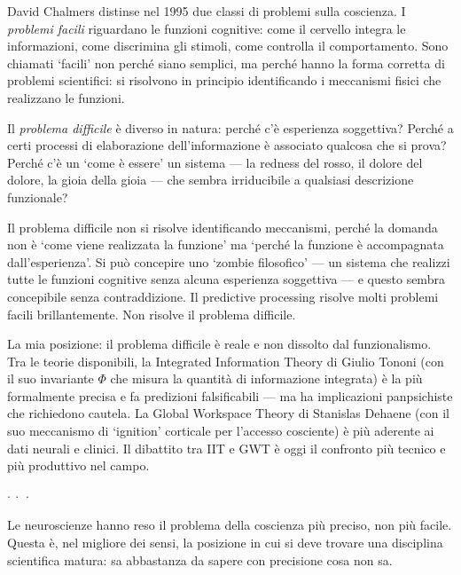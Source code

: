 \documentclass[12pt,a4paper,openany]{book}
\newcommand{\sezione}[1]{\vspace{1.2em}{\large\bfseries #1}\vspace{0.5em}\par}
\newcommand{\puntini}{\begin{center}$\cdot\ \cdot\ \cdot$\end{center}\vspace{0.3em}}
\begin{document}
\sezione{Il problema difficile della coscienza}

David Chalmers distinse nel 1995 due classi di problemi sulla coscienza. I \textit{problemi facili} riguardano le funzioni cognitive: come il cervello integra le informazioni, come discrimina gli stimoli, come controlla il comportamento. Sono chiamati `facili' non perché siano semplici, ma perché hanno la forma corretta di problemi scientifici: si risolvono in principio identificando i meccanismi fisici che realizzano le funzioni.

Il \textit{problema difficile} è diverso in natura: perché c'è esperienza soggettiva? Perché a certi processi di elaborazione dell'informazione è associato qualcosa che si prova? Perché c'è un `come è essere' un sistema — la redness del rosso, il dolore del dolore, la gioia della gioia — che sembra irriducibile a qualsiasi descrizione funzionale?

Il problema difficile non si risolve identificando meccanismi, perché la domanda non è `come viene realizzata la funzione' ma `perché la funzione è accompagnata dall'esperienza'. Si può concepire uno `zombie filosofico' — un sistema che realizzi tutte le funzioni cognitive senza alcuna esperienza soggettiva — e questo sembra concepibile senza contraddizione. Il predictive processing risolve molti problemi facili brillantemente. Non risolve il problema difficile.

La mia posizione: il problema difficile è reale e non dissolto dal funzionalismo. Tra le teorie disponibili, la Integrated Information Theory di Giulio Tononi (con il suo invariante $\Phi$ che misura la quantità di informazione integrata) è la più formalmente precisa e fa predizioni falsificabili — ma ha implicazioni panpsichiste che richiedono cautela. La Global Workspace Theory di Stanislas Dehaene (con il suo meccanismo di `ignition' corticale per l'accesso cosciente) è più aderente ai dati neurali e clinici. Il dibattito tra IIT e GWT è oggi il confronto più tecnico e più produttivo nel campo.

\puntini

Le neuroscienze hanno reso il problema della coscienza più preciso, non più facile. Questa è, nel migliore dei sensi, la posizione in cui si deve trovare una disciplina scientifica matura: sa abbastanza da sapere con precisione cosa non sa.

\end{document}

